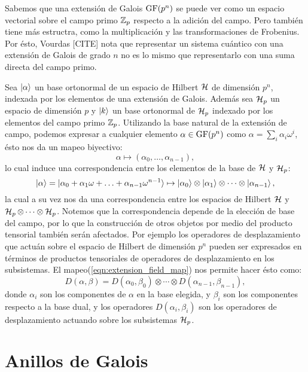 Sabemos que una extensión de Galois $\operatorname{GF}(p^{n})$ se puede
ver como un espacio vectorial sobre el campo primo $\operatorname{\mathbb{Z}}_p$
respecto a la adición del campo. Pero también tiene más
estructra, como la multiplicación y las transformaciones
de Frobenius. Por ésto, Vourdas [CITE] nota que
representar un sistema cuántico con una extensión de
Galois de grado $n$ no es lo mismo que representarlo con
una suma directa del campo primo. 

Sea $\ket{\alpha}$ un base ortonormal de un espacio de
Hilbert $\operatorname{\mathcal H}$ de dimensión $p^{n}$, indexada por los
elementos de una extensión de Galois. Además sea $\operatorname{\mathcal H}_p$ un
espacio de dimensión $p$ y $\ket{k}$ un base ortonormal de
$\operatorname{\mathcal H}_p$ indexado por los elementos del campo primo $\operatorname{\mathbb{Z}}_p$.
Utilizando la base natural de la extensión de campo,
podemos expresar a cualquier elemento $\alpha \in
\operatorname{GF}(p^{n})$ como $\alpha = \sum_{i}^{} \alpha_i \omega^{i}
$, ésto nos da un mapeo biyectivo:
\begin{equation}
  \label{eqn:extension_field_map}
  \alpha \mapsto (\alpha_0,\ldots,\alpha_{n-1}),
\end{equation} 
lo cual induce una correspondencia entre los elementos de
la base de $\operatorname{\mathcal H}$ y $\operatorname{\mathcal H}_p$:
\begin{equation}
  \ket{\alpha}
  = \ket{\alpha_0 + \alpha_1 \omega + \ldots +
    \alpha_{n-1}\omega^{n-1}}
  \mapsto \ket{\alpha_0} \otimes \ket{\alpha_1} \otimes
  \cdots \otimes \ket{\alpha_{n-1}},
\end{equation}
la cual a su vez nos da una correspondencia entre los
espacios de Hilbert $\operatorname{\mathcal H}$ y $\operatorname{\mathcal H}_p \otimes \cdots \otimes
\operatorname{\mathcal H}_p$. Notemos que la correspondencia depende de la
elección de base del campo, por lo que la construcción de
otros objetos por medio del producto tensorial también
serán afectados. Por ejemplo los operadores de
desplazamiento que actuán sobre el espacio de Hilbert de
dimensión $p^{n}$ pueden ser expresados en términos de
productos tensoriales de operadores de desplazamiento en
los subsistemas. El mapeo(\ref{eqn:extension_field_map})
nos permite hacer ésto como:
\begin{equation}
  D(\alpha,\beta)
  = D(\alpha_0, \beta_0) \otimes \cdots \otimes
  D(\alpha_{n-1}, \beta_{n-1}),
\end{equation}
donde $\alpha_i$ son los componentes de $\alpha$ en la
base elegida, y $\beta_i$ son los componentes respecto a
la base dual, y los operadores $D(\alpha_i,\beta_i)$ son
los operadores de desplazamiento actuando sobre los
subsistemas $\operatorname{\mathcal H}_p$.

\section{Anillos de Galois}

